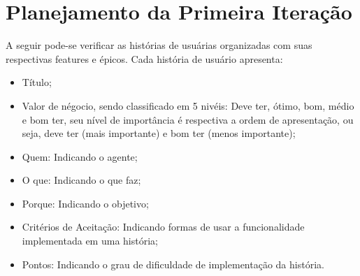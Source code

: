 \chapter[Planejamento da Primeira Iteração]{Planejamento da Primeira Iteração}

A seguir pode-se verificar as histórias de usuárias organizadas com suas respectivas features e épicos. Cada história de usuário apresenta:

\begin{itemize}
	\item Título;
	\item Valor de négocio, sendo classificado em 5 nivéis: Deve ter, ótimo, bom, médio e bom ter, seu nível de importância é respectiva a ordem de apresentação, ou seja, deve ter (mais importante) e bom ter (menos importante);
	\item Quem: Indicando o agente;
	\item O que: Indicando o que faz;
	\item Porque: Indicando o objetivo;
	\item Critérios de Aceitação: Indicando formas de usar a funcionalidade implementada em uma história;
	\item Pontos: Indicando o grau de dificuldade de implementação da história.
\end{itemize}

